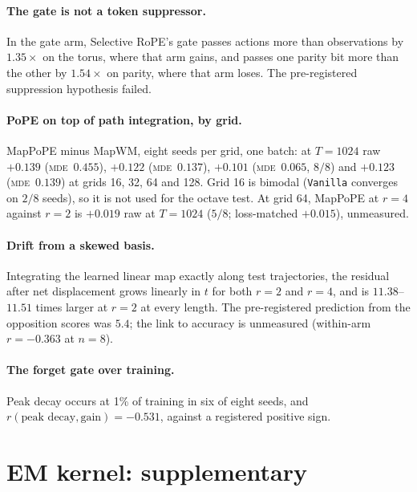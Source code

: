 \documentclass[10pt]{article}
\newcommand{\mde}{\textsc{mde}}
\newcommand{\arm}[1]{\texttt{#1}}
\begin{document}
\paragraph{The gate is not a token suppressor.} In the gate arm, Selective RoPE's gate passes actions more than
observations by $1.35\times$ on the torus, where that arm gains, and passes one parity bit more than the other by
$1.54\times$ on parity, where that arm loses. The pre-registered suppression hypothesis failed. %

\paragraph{PoPE on top of path integration, by grid.} MapPoPE minus MapWM, eight seeds per grid, one batch: at
$T=1024$ raw $+0.139$ (\mde\ $0.455$), $+0.122$ (\mde\ $0.137$), $+0.101$ (\mde\ $0.065$, $8/8$) and $+0.123$ (\mde\
$0.139$) at grids 16, 32, 64 and 128. Grid 16 is bimodal (\arm{Vanilla} converges on $2/8$ seeds), so it is not
used for the octave test. At grid 64, MapPoPE at $r=4$ against $r=2$ is $+0.019$ raw at $T=1024$ ($5/8$; loss-matched $+0.015$),
unmeasured.

\paragraph{Drift from a skewed basis.} Integrating the learned linear map exactly along test trajectories, the
residual after net displacement grows linearly in $t$ for both $r=2$ and $r=4$, and is $11.38$--$11.51$ times
larger at $r=2$ at every length. The pre-registered prediction from the opposition scores was $5.4$; the link to
accuracy is unmeasured (within-arm $r=-0.363$ at $n=8$). %

\paragraph{The forget gate over training.} Peak decay occurs at 1\% of training in six of eight seeds, and
$r(\text{peak decay},\text{gain})=-0.531$, against a registered positive sign. %

\section{EM kernel: supplementary}
\label{app:em}
\end{document}
